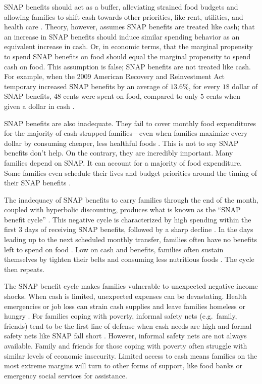 \documentclass[12pt,letterpaperpaper,]{book}
\begin{document}
SNAP benefits should act as a buffer, alleviating strained food budgets
and allowing families to shift cash towards other priorities, like rent,
utilities, and health care \citep{hoynes_snap_2015}. Theory, however,
assumes SNAP benefits are treated like cash; that an increase in SNAP
benefits should induce similar spending behavior as an equivalent
increase in cash. Or, in economic terms, that the marginal propensity to
spend SNAP benefits on food should equal the marginal propensity to
spend cash on food. This assumption is false; SNAP benefits are not
treated like cash. For example, when the 2009 American Recovery and
Reinvestment Act temporary increased SNAP benefits by an average of
\(13.6\%\), for every \(1\$\) dollar of SNAP benefits, \(48\) cents were
spent on food, compared to only \(5\) cents when given a dollar in cash
\citep{beatty_expenditure_2015}.

SNAP benefits are also inadequate. They fail to cover monthly food
expenditures for the majority of cash-strapped families---even when
families maximize every dollar by consuming cheaper, less healthful
foods \citep{wiig_art_2009}. This is not to say SNAP benefits don't
help. On the contrary, they are incredibly important. Many families
depend on SNAP. It can account for a majority of food expenditure. Some
families even schedule their lives and budget priorities around the
timing of their SNAP benefits \citep{edin_snap_2013}.

The inadequacy of SNAP benefits to carry families through the end of the
month, coupled with hyperbolic discounting, produces what is known as
the ``SNAP benefit cycle'' \citep{smith_effects_2016}. This negative
cycle is characterized by high spending within the first 3 days of
receiving SNAP benefits, followed by a sharp decline
\citep{goldin_is_2016}. In the days leading up to the next scheduled
monthly transfer, families often have no benefits left to spend on food
\citep{wilde_monthly_2000, shapiro_is_2005}. Low on cash and benefits,
families often sustain themselves by tighten their belts and consuming
less nutritious foods \citep{todd_revisiting_2015}. The cycle then
repeats.

The SNAP benefit cycle makes families vulnerable to unexpected negative
income shocks. When cash is limited, unexpected expenses can be
devastating. Health emergencies or job loss can strain cash supplies and
leave families homeless or hungry \citep{curtis_life_2013}. For families
coping with poverty, informal safety nets (e.g.~family, friends) tend to
be the first line of defense when cash needs are high and formal safety
nets like SNAP fall short \citep{schenck-fontaine_use_2016}. However,
informal safety nets are not always available. Family and friends for
those coping with poverty often struggle with similar levels of economic
insecurity. Limited access to cash means families on the most extreme
margins will turn to other forms of support, like food banks or
emergency social services for assistance.
\end{document}
